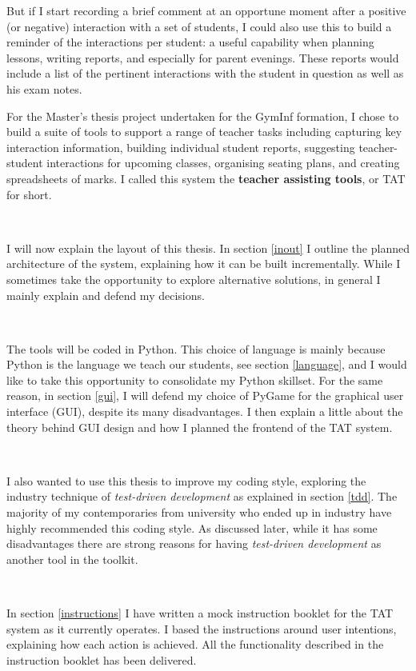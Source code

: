 \documentclass[10pt]{article}
\begin{document}
But if I start recording a brief comment at an opportune moment after a positive (or negative) interaction with a set of students, I could also use this to build a reminder of the interactions per student: a useful capability when planning lessons, writing reports, and especially for parent evenings. These reports would include a list of the pertinent interactions with the student in question as well as his exam notes.

For the Master's thesis project undertaken for the GymInf formation, I chose to build a suite of tools to support a range of teacher tasks including capturing key interaction information, building individual student reports, suggesting teacher-student interactions for upcoming classes, organising seating plans, and creating spreadsheets of marks. I called this system the \textbf{teacher assisting tools}, or TAT for short.

\

I will now explain the layout of this thesis. In section \ref{inout} I outline the planned architecture of the system, explaining how it can be built incrementally. While I sometimes take the opportunity to explore alternative solutions, in general I mainly explain and defend my decisions.

\

The tools will be coded in Python. This choice of language is mainly because Python is the language we teach our students, see section \ref{language}, and I would like to take this opportunity to consolidate my Python skillset. For the same reason, in section \ref{gui}, I will defend my choice of PyGame for the graphical user interface (GUI), despite its many disadvantages. I then explain a little about the theory behind GUI design and how I planned the frontend of the TAT system. 

\

I also wanted to use this thesis to improve my coding style, exploring the industry technique of \emph{test-driven development} as explained in section \ref{tdd}. The majority of my contemporaries from university who ended up in industry have highly recommended this coding style. As discussed later, while it has some disadvantages there are strong reasons for having \emph{test-driven development} as another tool in the toolkit\cite[p. 98]{Amman16}.

\

In section \ref{instructions} I have written a mock instruction booklet for the TAT system as it currently operates. I based the instructions around user intentions, explaining how each action is achieved. All the functionality described in the instruction booklet has been delivered.
\end{document}

